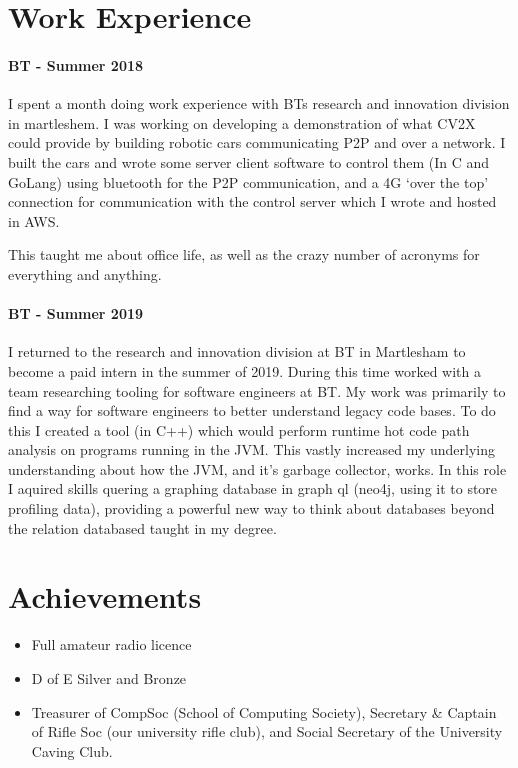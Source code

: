 \documentclass[9pt,a4paper]{article}
\begin{document}
\begin{multicols*}{3}
\section*{Work Experience}

\paragraph{BT - Summer 2018} I spent a month doing work experience with BTs research and innovation division in martleshem.
I was working on developing a demonstration of what CV2X could provide by building robotic cars communicating P2P and over a network.
I built the cars and wrote some server client software to control them (In C and GoLang) using bluetooth for the P2P communication, and a 4G `over the top' connection for communication with the control server which I wrote and hosted in AWS.

This taught me about office life, as well as the crazy number of acronyms for everything and anything.

\paragraph{BT - Summer 2019} I returned to the research and innovation division at BT in Martlesham to become a paid intern in the summer of 2019.
During this time worked with a team researching tooling for software engineers at BT.
My work was primarily to find a way for software engineers to better understand legacy code bases.
To do this I created a tool (in C++) which would perform runtime hot code path analysis on programs running in the JVM.
This vastly increased my underlying understanding about how the JVM, and it's garbage collector, works.
In this role I aquired skills quering a graphing database in graph ql (neo4j, using it to store profiling data), providing a powerful new way to think about databases beyond the relation databased taught in my degree.

\section*{Achievements}
\begin{itemize}
	\item Full amateur radio licence

	\item D of E Silver and Bronze

  \item Treasurer of CompSoc (School of Computing Society), Secretary \& Captain of Rifle Soc (our university rifle club), and Social Secretary of the University Caving Club.


\end{itemize}
\end{multicols*}
\end{document}
